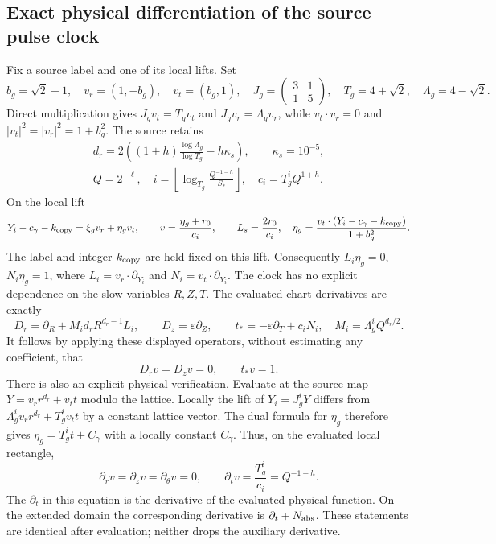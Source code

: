 \documentclass[11pt]{article}
\begin{document}
\subsection{Exact physical differentiation of the source pulse clock}

Fix a source label and one of its local lifts. Set
\[
 b_g=\sqrt2-1,\quad v_r=(1,-b_g),\quad v_t=(b_g,1),\quad
 J_g=\begin{pmatrix}3&1\\1&5\end{pmatrix},\quad
 T_g=4+\sqrt2,\quad\Lambda_g=4-\sqrt2.
\]
Direct multiplication gives $J_gv_t=T_gv_t$ and
$J_gv_r=\Lambda_gv_r$, while $v_t\cdot v_r=0$ and
$|v_t|^2=|v_r|^2=1+b_g^2$. The source retains
\[
\begin{gathered}
 d_r=2\left((1+h)\frac{\log\Lambda_g}{\log T_g}-h\kappa_s\right),\qquad
 \kappa_s=10^{-5},\\
 Q=2^{-\ell},\quad
 i=\left\lfloor\log_{T_g}\frac{Q^{-1-h}}{S_*}\right\rfloor,\quad
 c_i=T_g^iQ^{1+h}.
\end{gathered}
\]
On the local lift
\[
 Y_i-c_\gamma-k_{\rm copy}=\xi_gv_r+\eta_gv_t,\qquad
 v=\frac{\eta_g+r_0}{c_i},\qquad L_s=\frac{2r_0}{c_i},
 \quad
 \eta_g=\frac{v_t\cdot(Y_i-c_\gamma-k_{\rm copy})}{1+b_g^2}.
\]
The label and integer $k_{\rm copy}$ are held fixed on this lift.
Consequently $L_i\eta_g=0$, $N_i\eta_g=1$, where
$L_i=v_r\cdot\partial_{Y_i}$ and $N_i=v_t\cdot\partial_{Y_i}$.
The clock has no explicit dependence on the slow variables $R,Z,T$.
The evaluated chart derivatives are exactly
\[
 D_r=\partial_R+M_id_rR^{d_r-1}L_i,\qquad
 D_z=\varepsilon\partial_Z,\qquad
 t_*=-\varepsilon\partial_T+c_iN_i,
 \quad M_i=\Lambda_g^iQ^{d_r/2}.
\]
It follows by applying these displayed operators, without estimating
any coefficient, that
\begin{equation}\label{tgframe:clockchart}
 D_rv=D_zv=0,\qquad t_*v=1.
\end{equation}
There is also an explicit physical verification. Evaluate at the
source map $Y=v_rr^{d_r}+v_tt$ modulo the lattice. Locally the lift of
$Y_i=J_g^iY$ differs from
$\Lambda_g^iv_rr^{d_r}+T_g^iv_tt$ by a constant lattice vector.
The dual formula for $\eta_g$ therefore gives
$\eta_g=T_g^it+C_\gamma$ with a locally constant $C_\gamma$.
Thus, on the evaluated local rectangle,
\begin{equation}\label{tgframe:clockphysical}
 \partial_rv=\partial_zv=\partial_\theta v=0,\qquad
 \partial_tv=\frac{T_g^i}{c_i}=Q^{-1-h}.
\end{equation}
The $\partial_t$ in this equation is the derivative of the evaluated
physical function. On the extended domain the corresponding derivative
is $\partial_t+N_{\rm abs}$. These statements are identical after
evaluation; neither drops the auxiliary derivative.
\end{document}
